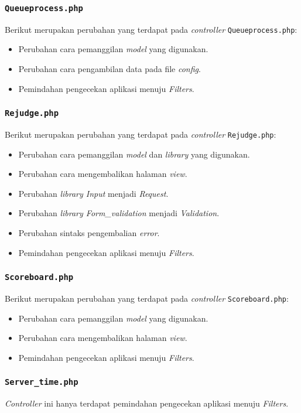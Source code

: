 \subsubsection{\texttt{Queueprocess.php}}
Berikut merupakan perubahan yang terdapat pada \textit{controller} \texttt{Queueprocess.php}:
\begin{itemize}
	\item Perubahan cara pemanggilan \textit{model} yang digunakan.
	\item Perubahan cara pengambilan data pada file \textit{config}.
	\item Pemindahan pengecekan aplikasi menuju \textit{Filters}.
\end{itemize}
\subsubsection{\texttt{Rejudge.php}}
Berikut merupakan perubahan yang terdapat pada \textit{controller} \texttt{Rejudge.php}:
\begin{itemize}
	\item Perubahan cara pemanggilan \textit{model} dan \textit{library} yang digunakan.
	\item Perubahan cara mengembalikan halaman \textit{view}.
	\item Perubahan \textit{library Input} menjadi \textit{Request}.
	\item Perubahan \textit{library Form\_validation} menjadi \textit{Validation}.
	\item Perubahan sintaks pengembalian \textit{error}.
	\item Pemindahan pengecekan aplikasi menuju \textit{Filters}.
\end{itemize}
\subsubsection{\texttt{Scoreboard.php}}
Berikut merupakan perubahan yang terdapat pada \textit{controller} \texttt{Scoreboard.php}:
\begin{itemize}
	\item Perubahan cara pemanggilan \textit{model} yang digunakan.
	\item Perubahan cara mengembalikan halaman \textit{view}.
	\item Pemindahan pengecekan aplikasi menuju \textit{Filters}.
\end{itemize}
\subsubsection{\texttt{Server\_time.php}}
\textit{Controller} ini hanya terdapat pemindahan pengecekan aplikasi menuju \textit{Filters}.
